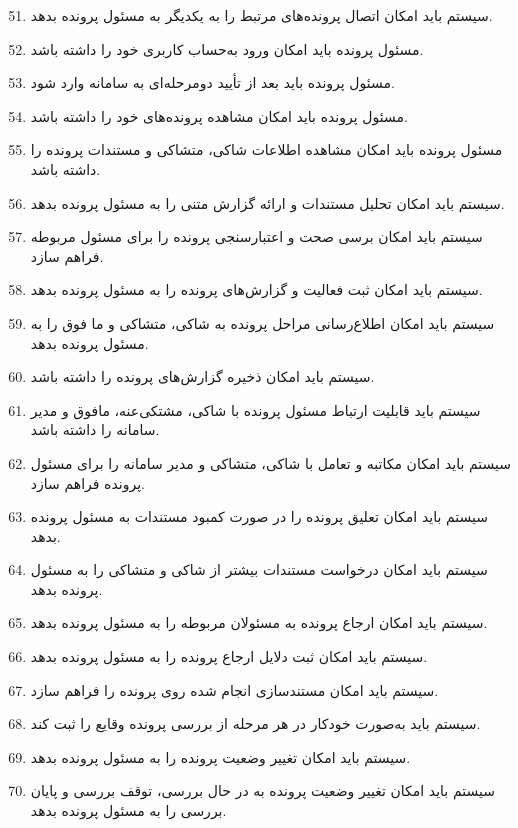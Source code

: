 \documentclass[12pt,a4paper,oneside]{article}
\begin{document}
	\begin{enumerate}[label=.R\arabic*]
		\setcounter{enumi}{50}
		\item سیستم باید امکان اتصال پرونده‌های مرتبط را به یکدیگر به مسئول پرونده بدهد.
		\item مسئول پرونده باید امکان ورود به‌حساب کاربری خود را داشته باشد.
		\item مسئول پرونده باید بعد از تأیید دومرحله‌ای به سامانه وارد شود.
		\item مسئول پرونده باید امکان مشاهده پرونده‌های خود را داشته باشد.
		\item مسئول پرونده باید امکان مشاهده اطلاعات شاکی، متشاکی و مستندات پرونده را داشته باشد.
		\item سیستم باید امکان تحلیل مستندات و ارائه گزارش متنی را به مسئول پرونده بدهد.
		\item سیستم باید امکان برسی صحت و اعتبارسنجی پرونده را برای مسئول مربوطه فراهم سازد.
		\item سیستم باید امکان ثبت فعالیت و گزارش‌های پرونده را به مسئول پرونده بدهد.
		\item سیستم باید امکان اطلاع‌رسانی مراحل پرونده به شاکی، متشاکی و ما فوق را به مسئول پرونده بدهد.
		\item سیستم باید امکان ذخیره گزارش‌های پرونده را داشته باشد.
		\item سیستم باید قابلیت ارتباط مسئول پرونده با شاکی، مشتکی‌عنه، مافوق و مدیر سامانه را داشته باشد.
		\item سیستم باید امکان مکاتبه و تعامل با شاکی، متشاکی و مدیر سامانه را برای مسئول پرونده فراهم سازد.
		\item سیستم باید امکان تعلیق پرونده را در صورت کمبود مستندات به مسئول پرونده بدهد.
		\item سیستم باید امکان درخواست مستندات بیشتر از شاکی و متشاکی را به مسئول پرونده بدهد.
		\item سیستم باید امکان ارجاع پرونده به مسئولان مربوطه را به مسئول پرونده بدهد.
		\item سیستم باید امکان ثبت دلایل ارجاع پرونده را به مسئول پرونده بدهد.
		\item سیستم باید امکان مستندسازی انجام شده روی پرونده را فراهم سازد.
		\item سیستم باید به‌صورت خودکار در هر مرحله از بررسی پرونده وقایع را ثبت کند.
		\item سیستم باید امکان تغییر وضعیت پرونده را به مسئول پرونده بدهد.
		\item سیستم باید امکان تغییر وضعیت پرونده به در حال بررسی، توقف بررسی و پایان بررسی را به مسئول پرونده بدهد.
	\end{enumerate}
	
\end{document}
